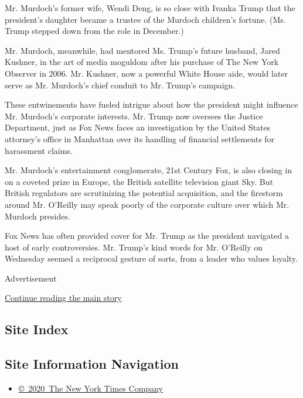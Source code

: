 Mr. Murdoch's former wife, Wendi Deng, is so close with Ivanka Trump
that the president's daughter became a trustee of the Murdoch children's
fortune. (Ms. Trump stepped down from the role in December.)

Mr. Murdoch, meanwhile, had mentored Ms. Trump's future husband, Jared
Kushner, in the art of media moguldom after his purchase of The New York
Observer in 2006. Mr. Kushner, now a powerful White House aide, would
later serve as Mr. Murdoch's chief conduit to Mr. Trump's campaign.

These entwinements have fueled intrigue about how the president might
influence Mr. Murdoch's corporate interests. Mr. Trump now oversees the
Justice Department, just as Fox News faces an investigation by the
United States attorney's office in Manhattan over its handling of
financial settlements for harassment claims.

Mr. Murdoch's entertainment conglomerate, 21st Century Fox, is also
closing in on a coveted prize in Europe, the British satellite
television giant Sky. But British regulators are scrutinizing the
potential acquisition, and the firestorm around Mr. O'Reilly may speak
poorly of the corporate culture over which Mr. Murdoch presides.

Fox News has often provided cover for Mr. Trump as the president
navigated a host of early controversies. Mr. Trump's kind words for Mr.
O'Reilly on Wednesday seemed a reciprocal gesture of sorts, from a
leader who values loyalty.

Advertisement

\protect\hyperlink{after-bottom}{Continue reading the main story}

\hypertarget{site-index}{%
\subsection{Site Index}\label{site-index}}

\hypertarget{site-information-navigation}{%
\subsection{Site Information
Navigation}\label{site-information-navigation}}

\begin{itemize}
\tightlist
\item
  \href{https://help.nytimes3xbfgragh.onion/hc/en-us/articles/115014792127-Copyright-notice}{©~2020~The
  New York Times Company}
\end{itemize}

